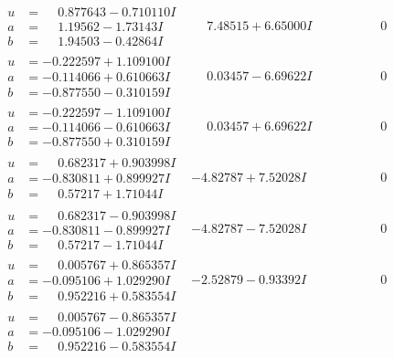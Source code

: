 \documentclass[1p]{elsarticle_modified}
\theoremstyle{definition}
\begin{document}
$$\begin{array}{c|c|c}
\begin{aligned}
u &= \phantom{-}0.877643 - 0.710110 I \\
a &= \phantom{-}1.19562 - 1.73143 I \\
b &= \phantom{-}1.94503 - 0.42864 I\end{aligned}
 & \phantom{-}7.48515 + 6.65000 I & \phantom{-0.000000 } 0 \\ \hline\begin{aligned}
u &= -0.222597 + 1.109100 I \\
a &= -0.114066 + 0.610663 I \\
b &= -0.877550 - 0.310159 I\end{aligned}
 & \phantom{-}0.03457 - 6.69622 I & \phantom{-0.000000 } 0 \\ \hline\begin{aligned}
u &= -0.222597 - 1.109100 I \\
a &= -0.114066 - 0.610663 I \\
b &= -0.877550 + 0.310159 I\end{aligned}
 & \phantom{-}0.03457 + 6.69622 I & \phantom{-0.000000 } 0 \\ \hline\begin{aligned}
u &= \phantom{-}0.682317 + 0.903998 I \\
a &= -0.830811 + 0.899927 I \\
b &= \phantom{-}0.57217 + 1.71044 I\end{aligned}
 & -4.82787 + 7.52028 I & \phantom{-0.000000 } 0 \\ \hline\begin{aligned}
u &= \phantom{-}0.682317 - 0.903998 I \\
a &= -0.830811 - 0.899927 I \\
b &= \phantom{-}0.57217 - 1.71044 I\end{aligned}
 & -4.82787 - 7.52028 I & \phantom{-0.000000 } 0 \\ \hline\begin{aligned}
u &= \phantom{-}0.005767 + 0.865357 I \\
a &= -0.095106 + 1.029290 I \\
b &= \phantom{-}0.952216 + 0.583554 I\end{aligned}
 & -2.52879 - 0.93392 I & \phantom{-0.000000 } 0 \\ \hline\begin{aligned}
u &= \phantom{-}0.005767 - 0.865357 I \\
a &= -0.095106 - 1.029290 I \\
b &= \phantom{-}0.952216 - 0.583554 I\end{aligned}

\end{array}$$
\end{document}
